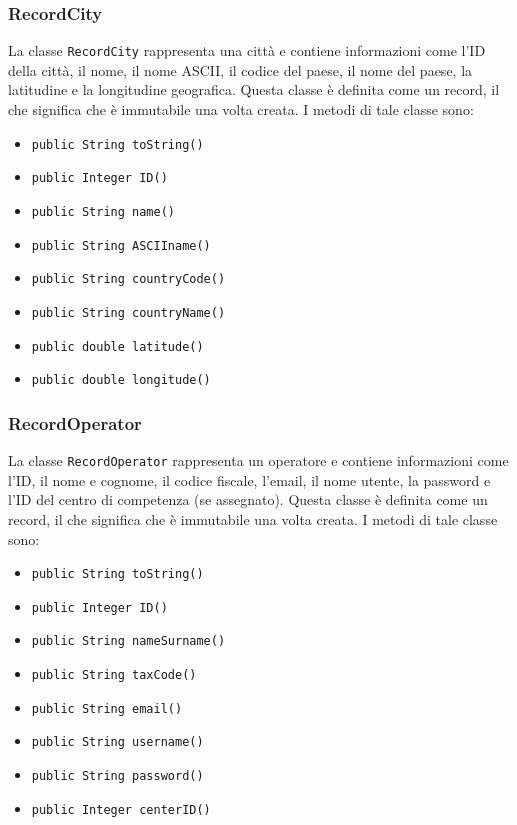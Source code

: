 \subsubsection{RecordCity}
La classe \texttt{RecordCity} rappresenta una città e contiene informazioni come l'ID della città, il nome, il nome ASCII, il codice del paese, il nome del paese, la latitudine e la longitudine geografica.
Questa classe è definita come un record, il che significa che è immutabile una volta creata.
I metodi di tale classe sono:
\begin{itemize}
    \item \texttt{public String toString()}
    \item \texttt{public Integer ID()}
    \item \texttt{public String name()}
    \item \texttt{public String ASCIIname()}
    \item \texttt{public String countryCode()}
    \item \texttt{public String countryName()}
    \item \texttt{public double latitude()}
    \item \texttt{public double longitude()}
\end{itemize}

\subsubsection{RecordOperator}
La classe \texttt{RecordOperator} rappresenta un operatore e contiene informazioni come l'ID, il nome e cognome, il codice fiscale, l'email, il nome utente, la password e l'ID del centro di competenza (se assegnato).
Questa classe è definita come un record, il che significa che è immutabile una volta creata.
I metodi di tale classe sono:
\begin{itemize}
    \item \texttt{public String toString()}
    \item \texttt{public Integer ID()}
    \item \texttt{public String nameSurname()}
    \item \texttt{public String taxCode()}
    \item \texttt{public String email()}
    \item \texttt{public String username()}
    \item \texttt{public String password()}
    \item \texttt{public Integer centerID()}
\end{itemize}

